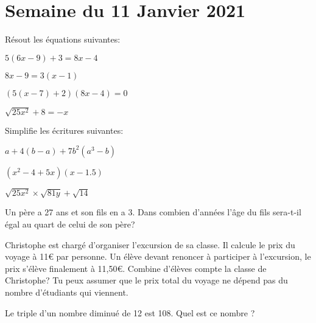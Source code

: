 \section{Semaine du 11 Janvier 2021}

\begin{exercicefr}
    Résout les équations suivantes:
    \begin{exerciceenumnoeq}
        \item $5(6x - 9) + 3 = 8x - 4$
        \item $8x - 9 = 3(x - 1)$
        \item $(5(x - 7) + 2)(8x - 4) = 0$
        \item $\sqrt{25x^2} + 8 = -x$
    \end{exerciceenumnoeq}
\end{exercicefr}

\begin{exercicefr}
    Simplifie les écritures suivantes:
    \begin{exerciceenum}
        \item $a+4(b-a) + 7b^2(a^3 -b)$
        \item $(x^2 -4 + 5x)(x-1.5)$
        \item $\sqrt{25 x^2} \times \sqrt{81 y} + \sqrt{14}$
    \end{exerciceenum}
\end{exercicefr}

\begin{exercicefr}
    Un père a 27 ans et son fils en a 3. Dans combien d’années l’âge du fils sera-t-il égal au quart de celui de son père?
\end{exercicefr}

\begin{exercicefr}
    Christophe est chargé d’organiser l’excursion de sa classe. Il calcule le prix du voyage à 11€ par personne. Un élève devant renoncer à participer à l'excursion, le prix s’élève finalement à 11,50€. Combine d’élèves compte la classe de Christophe? Tu peux assumer que le prix total du voyage ne dépend pas du nombre d'étudiants qui viennent.
\end{exercicefr}

\begin{exercicefr}
    Le triple d’un nombre diminué de 12 est 108. Quel est ce nombre ?
\end{exercicefr}